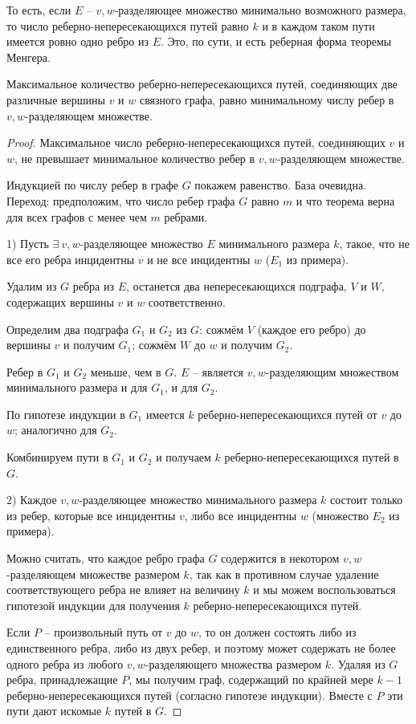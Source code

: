 	То есть, если $E$ -- $v,w$-разделяющее множество минимально возможного размера, то число реберно-непересекающихся путей равно $k$ и в каждом
	таком пути имеется ровно одно ребро из $E$. Это, по сути, и есть реберная форма теоремы Менгера.

	\begin{Thm}
		Максимальное количество реберно-непересекающихся путей, соединяющих две различные вершины $v$ и $w$ связного графа, равно минимальному числу ребер в $v,w$-разделяющем множестве.	
	\end{Thm}

	\begin{proof}
		Максимальное число реберно-непересекающихся путей, соединяющих $v$ и $w$, не превышает минимальное количество ребер в $v, w$-разделяющем множестве.
		
		Индукцией по числу ребер в графе $G$ покажем равенство. База очевидна. Переход: предположим, что число ребер графа $G$ равно $m$ и что теорема верна для всех графов с менее чем $m$ ребрами.

		1) Пусть $\exists \ v, w$-разделяющее множество $E$ минимального размера $k$, такое, что не все его ребра инцидентны $v$ и не все инцидентны $w$ ($E_1$ из примера).

		Удалим из $G$ ребра из $E$, останется два непересекающихся подграфа, $V$ и $W$, содержащих вершины $v$ и $w$ соответственно.

		Определим два подграфа $G_1$ и $G_2$ из $G$: сожмём $V$ (каждое его ребро) до вершины $v$ и получим $G_1$; сожмём $W$ до $w$ и получим $G_2$.

		Ребер в $G_1$ и $G_2$ меньше, чем в $G$. $E$ -- является $v, w$-разделяющим множеством минимального размера и для $G_1$, и для $G_2$.

		По гипотезе индукции в $G_1$ имеется $k$ реберно-непересекающихся путей от $v$ до $w$; аналогично для $G_2$.

		Комбинируем пути в $G_1$ и $G_2$ и получаем $k$ реберно-непересекающихся путей в $G$.

		2) Каждое $v,w$-разделяющее множество минимального размера $k$ состоит только из ребер, которые все инцидентны $v$, либо все инцидентны $w$ (множество $E_2$ из примера).

		Можно считать, что каждое ребро графа $G$ содержится в некотором $v,w$-разделяющем множестве размером $k$, так как в противном случае удаление соответствующего ребра не влияет на величину $k$
		и мы можем воспользоваться гипотезой индукции для получения $k$ реберно-непересекающихся путей.

		Если $P$ -- произвольный путь от $v$ до $w$, то он должен состоять либо из единственного ребра, либо из двух ребер, и поэтому может содержать не более одного ребра из любого $v,w$-разделяющего множества размером $k$.
		Удаляя из $G$ ребра, принадлежащие $P$, мы получим граф, содержащий по крайней мере $k-1$ реберно-непересекающихся путей (согласно гипотезе индукции). Вместе с $P$ эти пути дают искомые $k$ путей в $G$.
	\end{proof}

